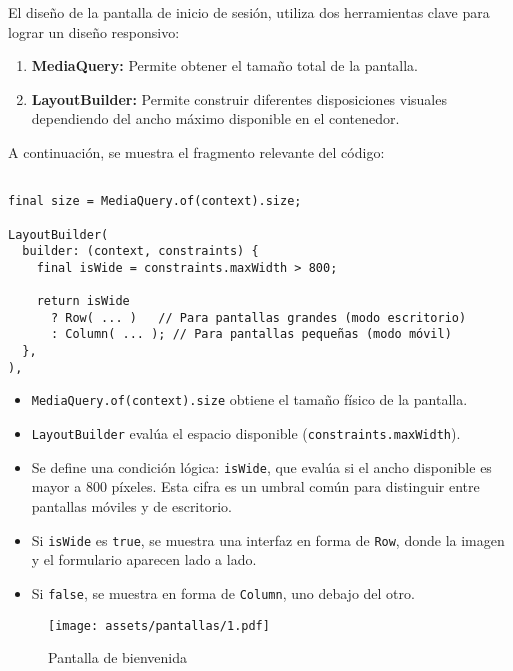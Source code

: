 El diseño de la pantalla de inicio de sesión, %
utiliza dos herramientas clave para lograr un diseño responsivo:

\begin{enumerate}
    \item \textbf{MediaQuery:} Permite obtener el tamaño total de la pantalla.
    \item \textbf{LayoutBuilder:} Permite construir diferentes disposiciones visuales dependiendo del ancho máximo disponible en el contenedor.
\end{enumerate}

A continuación, se muestra el fragmento relevante del código:

\begin{verbatim}

final size = MediaQuery.of(context).size;

LayoutBuilder(
  builder: (context, constraints) {
    final isWide = constraints.maxWidth > 800;

    return isWide
      ? Row( ... )   // Para pantallas grandes (modo escritorio)
      : Column( ... ); // Para pantallas pequeñas (modo móvil)
  },
),
\end{verbatim}



\begin{itemize}
    \item \texttt{MediaQuery.of(context).size} obtiene el tamaño físico de la pantalla.
    \item \texttt{LayoutBuilder} evalúa el espacio disponible (\texttt{constraints.maxWidth}).
    \item Se define una condición lógica: \texttt{isWide}, que evalúa si el ancho disponible es mayor a 800 píxeles. Esta cifra es un umbral común para distinguir entre pantallas móviles y de escritorio.
    \item Si \texttt{isWide} es \texttt{true}, se muestra una interfaz en forma de \texttt{Row}, donde la imagen y el formulario aparecen lado a lado.
    \item Si \texttt{false}, se muestra en forma de \texttt{Column}, uno debajo del otro.
\end{itemize}

\begin{figure}[h!]
\centering
  \texttt{[image: assets/pantallas/1.pdf]}
  \caption{Pantalla de bienvenida}
  \label{pantallas1}
\end{figure}

